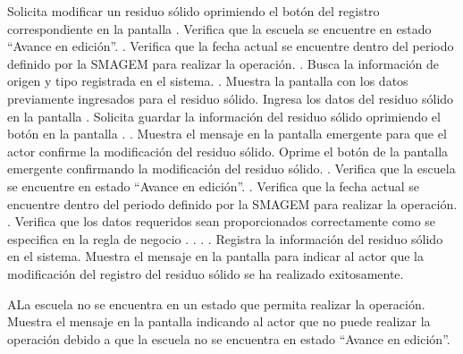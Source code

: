  \begin{UCtrayectoria}
    \UCpaso[\UCactor] Solicita modificar un residuo sólido oprimiendo el botón \botEdit del registro correspondiente en la pantalla .
    \UCpaso[\UCsist] Verifica que la escuela se encuentre en estado ``Avance en edición''. .
    \UCpaso[\UCsist] Verifica que la fecha actual se encuentre dentro del periodo definido por la SMAGEM para realizar la operación. .
    \UCpaso[\UCsist] Busca la información de origen y tipo registrada en el sistema. .
    \UCpaso[\UCsist] Muestra la pantalla  con los datos previamente ingresados para el residuo sólido.
    \UCpaso[\UCactor] Ingresa los datos del residuo sólido en la pantalla . \label{cus31:Modificar}
    \UCpaso[\UCactor] Solicita guardar la información del residuo sólido oprimiendo el botón  en la pantalla . .
    \UCpaso[\UCsist] Muestra el mensaje  en la pantalla emergente  para que el actor confirme la modificación del residuo sólido.
     \UCpaso[\UCactor] Oprime el botón  de la pantalla emergente  confirmando la modificación del residuo sólido. .
     \UCpaso[\UCsist] Verifica que la escuela se encuentre en estado ``Avance en edición''. .
    \UCpaso[\UCsist] Verifica que la fecha actual se encuentre dentro del periodo definido por la SMAGEM para realizar la operación. .
    \UCpaso[\UCsist] Verifica que los datos requeridos sean proporcionados correctamente como se especifica en la regla de negocio . . . .
    \UCpaso[\UCsist] Registra la información del residuo sólido en el sistema.
    \UCpaso[\UCsist] Muestra el mensaje  en la pantalla  para indicar al actor que la modificación del registro del residuo sólido se ha realizado exitosamente. 
    
 \end{UCtrayectoria}
 
    \begin{UCtrayectoriaA}{A}{La escuela no se encuentra en un estado que permita realizar la operación.}
    \UCpaso[\UCsist] Muestra el mensaje  en la pantalla  indicando al actor que no puede realizar la operación debido a que la escuela no se encuentra en estado ``Avance en edición''. 
 \end{UCtrayectoriaA}
 
